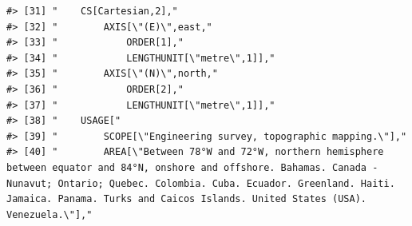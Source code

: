 \documentclass[
]{book}
\begin{document}
\begin{verbatim}
#> [31] "    CS[Cartesian,2],"                                                                                                                                                                                                                                                           
#> [32] "        AXIS[\"(E)\",east,"                                                                                                                                                                                                                                                     
#> [33] "            ORDER[1],"                                                                                                                                                                                                                                                          
#> [34] "            LENGTHUNIT[\"metre\",1]],"                                                                                                                                                                                                                                          
#> [35] "        AXIS[\"(N)\",north,"                                                                                                                                                                                                                                                    
#> [36] "            ORDER[2],"                                                                                                                                                                                                                                                          
#> [37] "            LENGTHUNIT[\"metre\",1]],"                                                                                                                                                                                                                                          
#> [38] "    USAGE["                                                                                                                                                                                                                                                                     
#> [39] "        SCOPE[\"Engineering survey, topographic mapping.\"],"                                                                                                                                                                                                                   
#> [40] "        AREA[\"Between 78°W and 72°W, northern hemisphere between equator and 84°N, onshore and offshore. Bahamas. Canada - Nunavut; Ontario; Quebec. Colombia. Cuba. Ecuador. Greenland. Haiti. Jamaica. Panama. Turks and Caicos Islands. United States (USA). Venezuela.\"],"

\end{verbatim}
\end{document}
